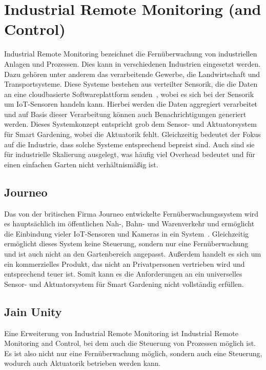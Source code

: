 \section{Industrial Remote Monitoring (and Control)}
Industrial Remote Monitoring bezeichnet die Fernüberwachung von industriellen Anlagen und Prozessen.
Dies kann in verschiedenen Industrien eingesetzt werden.
Dazu gehören unter anderem das verarbeitende Gewerbe, die Landwirtschaft und Transportsysteme.
Diese Systeme bestehen aus verteilter Sensorik, die die Daten an eine cloudbasierte Softwareplattform senden~\cite{IdustrialRemoteMonitoring}, wobei es sich bei der Sensorik um IoT-Sensoren handeln kann.
Hierbei werden die Daten aggregiert verarbeitet und auf Basis dieser Verarbeitung können auch Benachrichtigungen generiert werden.
Dieses Systemkonzept entspricht grob dem Sensor- und Aktuatorsystem für Smart Gardening, wobei die Aktuatorik fehlt.
Gleichzeitig bedeutet der Fokus auf die Industrie, dass solche Systeme entsprechend bepreist sind.
Auch sind sie für industrielle Skalierung ausgelegt, was häufig viel Overhead bedeutet und für einen einfachen Garten nicht verhältnismäßig ist.

\subsection{Journeo}
Das von der britischen Firma Journeo entwickelte Fernüberwachungssystem wird es hauptsächlich im öffentlichen Nah-, Bahn- und Warenverkehr und ermöglicht die Einbindung vieler IoT-Sensoren und Kameras in ein System~\cite{Journeo}.
Gleichzeitig ermöglicht dieses System keine Steuerung, sondern nur eine Fernüberwachung und ist auch nicht an den Gartenbereich angepasst.
Außerdem handelt es sich um ein kommerzielles Produkt, das nicht an Privatpersonen vertrieben wird und entsprechend teuer ist.
Somit kann es die Anforderungen an ein universelles Sensor- und Aktuatorsystem für Smart Gardening nicht vollständig erfüllen.

\subsection{Jain Unity}
Eine Erweiterung von Industrial Remote Monitoring ist Industrial Remote Monitoring and Control, bei dem auch die Steuerung von Prozessen möglich ist.
Es ist also nicht nur eine Fernüberwachung möglich, sondern auch eine Steuerung, wodurch auch Aktuatorik betrieben werden kann.

